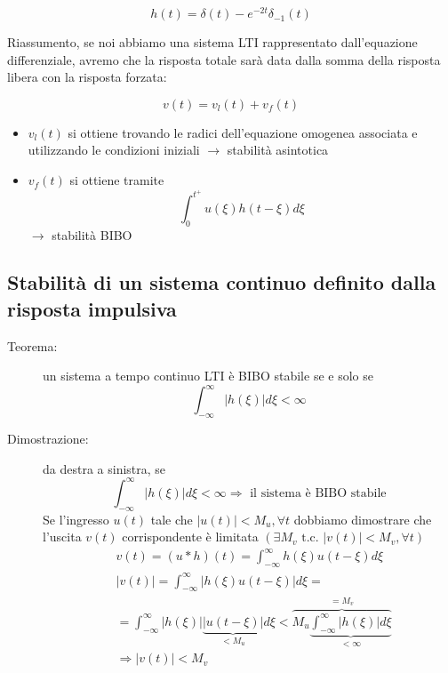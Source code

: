 \documentclass[a4paper, 12pt]{book}
\theoremstyle{plain}
\begin{document}
\[
    h(t) = \delta(t) - e^{-2t} \delta_{-1}(t)
\]

Riassumento, se noi abbiamo una sistema LTI rappresentato dall'equazione differenziale, avremo che la risposta totale sarà data dalla somma della risposta libera con la risposta forzata:

\[
    v(t) = v_l(t) + v_f(t)
\]

\begin{itemize}
    \item $v_l(t)$ si ottiene trovando le radici dell'equazione omogenea associata e utilizzando le condizioni iniziali $\rightarrow$ stabilità asintotica
    \item $v_f(t)$ si ottiene tramite \[\int_0^{t^+} u(\xi)h(t - \xi) d\xi\] $\rightarrow$ stabilità BIBO
\end{itemize}

\subsection{Stabilità di un sistema continuo definito dalla risposta impulsiva}

\begin{description}
    \item[Teorema:] un sistema a tempo continuo LTI è BIBO stabile se e solo se \[ \int_{-\infty}^\infty |h(\xi)|d\xi < \infty\]
    \item[Dimostrazione:] da destra a sinistra, se \[\int_{-\infty}^\infty |h(\xi)|d\xi < \infty \Rightarrow \textrm{ il sistema è BIBO stabile}\] Se l'ingresso $u(t)$ tale che $|u(t)| < M_u, \forall t$ dobbiamo dimostrare che l'uscita $v(t)$ corrispondente  è limitata $(\exists M_v \textrm{ t.c. } |v(t)| < M_v, \forall t)$ \[ \begin{split}
        &v(t) = (u \ast h)(t) = \int_{-\infty}^\infty h(\xi) u(t - \xi) d\xi \\
        &|v(t)| = \int_{-\infty}^\infty |h(\xi) u(t - \xi)| d\xi = \\
        &= \int_{-\infty}^{\infty} |h(\xi)|\underbrace{|u(t - \xi)|}_{< M_u} d\xi < \overbrace{M_u \underbrace{\int_{-\infty}^\infty|h(\xi)|d\xi}_{< \infty}}^{= M_v} \\
        &\Rightarrow |v(t)| < M_v
    \end{split} 
    \]
\end{description}
\end{document}
